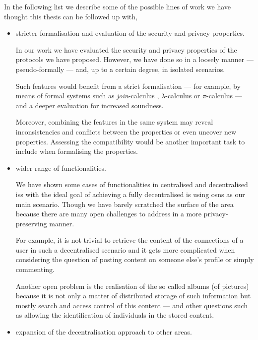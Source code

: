 In the following list we describe some of the possible lines of work we have thought 
this thesis can be followed up with,
\begin{itemize}[topsep=\parskip, parsep=\parskip, itemsep=\parskip]
    
    \item stricter formalisation and evaluation of the security and privacy properties.
    
    In our work we have evaluated the security and privacy properties of the protocols 
    we have proposed. However, we have done so in a loosely manner --- pseudo-formally 
    --- and, up to a certain degree, in isolated scenarios.
    
    Such features would benefit from a strict formalisation --- for example, by 
    means of formal systems such as \emph{join}-calculus \cite{FournetG96}, \(\lambda\)-calculus 
    \cite{Church36} or \(\pi\)-calculus \cite{MilnerPW92} --- and a deeper evaluation 
    for increased soundness.
    
    Moreover, combining the features in the same system may reveal inconsistencies 
    and conflicts between the properties or even uncover new properties. Assessing 
    the compatibility would be another important task to include when formalising 
    the properties.
    
    \item wider range of functionalities.
    
    We have shown some cases of functionalities in centralised and decentralised 
    \acp{is} with the ideal goal of achieving a fully decentralised \ac{is} using 
    \acp{osn} as our main scenario. Though we have barely scratched the surface 
    of the area because there are many open challenges to address in a more privacy-preserving 
    manner.
    
    For example, it is not trivial to retrieve the content of the connections of 
    a user in such a decentralised scenario and it gets more complicated when considering 
    the question of posting content on someone else's profile or simply commenting. 
    
    Another open problem is the realisation of the so called albums (of pictures) 
    because it is not only a matter of distributed storage of such information but 
    mostly search and access control of this content --- and other questions such 
    as allowing the identification of individuals in the stored content.
    
    \item expansion of the decentralisation approach to other areas.
    

\end{itemize}
